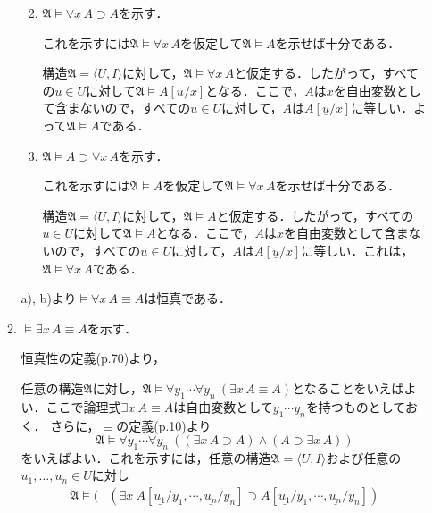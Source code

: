 \documentclass[11pt,dvipdfmx]{jreport}
\begin{document}
\begin{enumerate}
\begin{enumerate}
    \begin{enumerate}
    \renewcommand{\labelenumiii}{\alph{enumiii}) }
     \item 
      $\mathfrak{A} \models \forall x \, A \supset A$を示す．
      \par \noindent
      これを示すには$\mathfrak{A} \models \forall x \, A$を仮定して$\mathfrak{A} \models A$を示せば十分である．
      \par \noindent
      構造$\mathfrak{A} = \langle U, I \rangle$に対して，$\mathfrak{A} \models \forall x \, A$と仮定する．したがって，すべての$u \in U$に対して$\mathfrak{A} \models A[\underline{u}/x]$となる．ここで，$A$は$x$を自由変数として含まないので，すべての$u \in U$に対して，$A$は$A[\underline{u}/x]$に等しい．よって$\mathfrak{A} \models A$である．
     \item 
      $\mathfrak{A} \models A \supset \forall x \, A$を示す．
      \par \noindent
      これを示すには$\mathfrak{A} \models A$を仮定して$\mathfrak{A} \models \forall x \, A$を示せば十分である．
      \par \noindent
      構造$\mathfrak{A} = \langle U, I \rangle$に対して，$\mathfrak{A} \models A$と仮定する．したがって，すべての$u \in U$に対して$\mathfrak{A} \models A$となる．ここで，$A$は$x$を自由変数として含まないので，すべての$u \in U$に対して，$A$は$A[\underline{u}/x]$に等しい．これは，$\mathfrak{A} \models \forall x \, A$である．
    \end{enumerate}
   a), b)より$\models \forall x \, A \equiv A$は恒真である．
   \item $\models \exists x \, A \equiv A$を示す．
    \par \noindent 
    恒真性の定義(p.70)より，
    \par \noindent
    任意の構造$\mathfrak{A}$に対し，$\mathfrak{A} \models \forall y_{1} \cdots \forall y_{n} \ (\exists x \, A \equiv A)$となることをいえばよい．ここで論理式$\exists x \ A \equiv A$は自由変数として$y_{1} \cdots y_{n}$を持つものとしておく．
さらに，$\equiv$の定義(p.10)より
    \begin{equation*}
     \mathfrak{A} \models \forall y_{1} \cdots \forall y_{n} \ ((\exists x \, A \supset A) \land (A \supset \exists x \, A))
    \end{equation*}
    をいえばよい．これを示すには，任意の構造$\mathfrak{A} = \langle U, I \rangle$および任意の$u_{1}, \dots, u_{n} \in U$に対し
    \begin{align*}
     \mathfrak{A} \models ( & (\exists x \ A[ \underline{u_{1}} / y_{1}, \cdots , \underline{u_{n}} / y_{n}] \supset A[\underline{u_{1}}/y_{1}, \cdots , \underline{u_{n}}/y_{n}]) \\

\end{align*}
\end{enumerate}
\end{enumerate}
\end{document}
